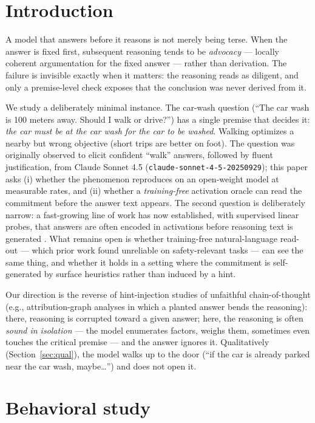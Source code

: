\documentclass[11pt]{article}
\newcommand{\code}[1]{\texttt{#1}}
\begin{document}
\section{Introduction}

A model that answers before it reasons is not merely being terse. When the
answer is fixed first, subsequent reasoning tends to be \emph{advocacy} ---
locally coherent argumentation for the fixed answer --- rather than
derivation. The failure is invisible exactly when it matters: the reasoning
reads as diligent, and only a premise-level check exposes that the
conclusion was never derived from it.

We study a deliberately minimal instance. The car-wash question (``The car
wash is 100 meters away. Should I walk or drive?'') has a single premise
that decides it: \emph{the car must be at the car wash for the car to be
washed}. Walking optimizes a nearby but wrong objective (short trips are
better on foot). The question was originally observed to elicit confident
``walk'' answers, followed by fluent justification, from Claude Sonnet 4.5
(\code{claude-sonnet-4-5-20250929}); this paper asks (i) whether the
phenomenon reproduces on an open-weight model at measurable rates, and
(ii) whether a \emph{training-free} activation oracle can read the
commitment before the answer text appears. The second question is
deliberately narrow: a fast-growing line of work has now established,
with supervised linear probes, that answers are often encoded in
activations before reasoning text is generated
\citep{cox,boppana,mirtaheri,scalena}. What remains open is whether
training-free natural-language read-out --- which prior work found
unreliable on safety-relevant tasks --- can see the same thing, and
whether it holds in a setting where the commitment is self-generated by
surface heuristics rather than induced by a hint.

Our direction is the reverse of hint-injection studies of unfaithful
chain-of-thought (e.g., attribution-graph analyses in which a planted answer
bends the reasoning): there, reasoning is corrupted toward a given answer;
here, the reasoning is often \emph{sound in isolation} --- the model
enumerates factors, weighs them, sometimes even touches the critical premise
--- and the answer ignores it. Qualitatively (Section~\ref{sec:qual}), the
model walks up to the door (``if the car is already parked near the car
wash, maybe\ldots'') and does not open it.

\section{Behavioral study}
\end{document}
